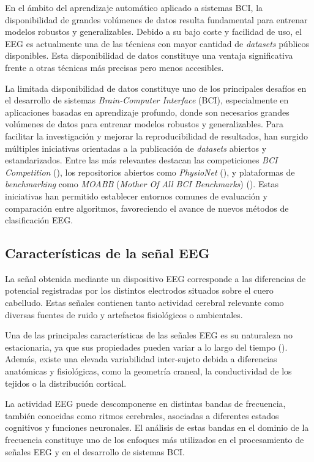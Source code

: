 En el ámbito del aprendizaje automático aplicado a sistemas BCI, la disponibilidad de grandes volúmenes de datos resulta fundamental para entrenar modelos robustos y generalizables. Debido a su bajo coste y facilidad de uso, el EEG es actualmente una de las técnicas con mayor cantidad de \textit{datasets} públicos disponibles. Esta disponibilidad de datos constituye una ventaja significativa frente a otras técnicas más precisas pero menos accesibles.

La limitada disponibilidad de datos constituye uno de los principales desafíos en el desarrollo de sistemas \textit{Brain-Computer Interface} (BCI), especialmente en aplicaciones basadas en aprendizaje profundo, donde son necesarios grandes volúmenes de datos para entrenar modelos robustos y generalizables. Para facilitar la investigación y mejorar la reproducibilidad de resultados, han surgido múltiples iniciativas orientadas a la publicación de \textit{datasets} abiertos y estandarizados. Entre las más relevantes destacan las competiciones \textit{BCI Competition} (\cite{bci_competition_iv}), los repositorios abiertos como \textit{PhysioNet} (\cite{physionet_eeg}), y plataformas de \textit{benchmarking} como \textit{MOABB} (\textit{Mother Of All BCI Benchmarks}) (\cite{moabb}). Estas iniciativas han permitido establecer entornos comunes de evaluación y comparación entre algoritmos, favoreciendo el avance de nuevos métodos de clasificación EEG.

\subsection{Características de la señal EEG}
\label{subsec:CaracteristicasEEG}

La señal obtenida mediante un dispositivo EEG corresponde a las diferencias de potencial registradas por los distintos electrodos situados sobre el cuero cabelludo. Estas señales contienen tanto actividad cerebral relevante como diversas fuentes de ruido y artefactos fisiológicos o ambientales.

Una de las principales características de las señales EEG es su naturaleza no estacionaria, ya que sus propiedades pueden variar a lo largo del tiempo (\cite{lotte2018review}). Además, existe una elevada variabilidad inter-sujeto debida a diferencias anatómicas y fisiológicas, como la geometría craneal, la conductividad de los tejidos o la distribución cortical.

La actividad EEG puede descomponerse en distintas bandas de frecuencia, también conocidas como ritmos cerebrales, asociadas a diferentes estados cognitivos y funciones neuronales. El análisis de estas bandas en el dominio de la frecuencia constituye uno de los enfoques más utilizados en el procesamiento de señales EEG y en el desarrollo de sistemas BCI.

